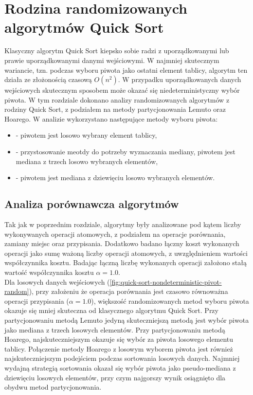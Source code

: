 \section{Rodzina randomizowanych algorytmów Quick Sort}
Klasyczny algorytm Quick Sort kiepsko sobie radzi z uporządkowanymi lub prawie uporządkowanymi danymi wejściowymi. W najmniej skutecznym wariancie, tzn. podczas wyboru piwota jako ostatni element tablicy, algorytm ten działa ze złożonością czasową $O(n^2)$. W przypadku uporządkowanych danych wejściowych skutecznym sposobem może okazać się niedeterministyczny wybór piwota. W tym rozdziale dokonano analizy randomizowanych algorytmów z rodziny Quick Sort, z podziałem na metody partycjonowania Lemuto oraz Hoarego. W analizie wykorzystano następujące metody wyboru piwota:

\begin{itemize}
	\setlength\itemsep{0em}
	\item {} - piwotem jest losowo wybrany element tablicy,
	\item {} - przystosowanie meotdy  do potrzeby wyznaczania mediany, piwotem jest mediana z trzech losowo wybranych elementów,
	\item {} - piwotem jest mediana z dziewięciu losowo wybranych elementów.\\
\end{itemize}

\subsection{Analiza porównawcza algorytmów}
Tak jak w poprzednim rozdziale, algorytmy były analizowane pod kątem liczby wykonywanych operacji atomowych, z podziałem na operacje porównania, zamiany miejsc oraz przypisania. Dodatkowo badano łączny koszt wykonanych operacji jako sumę ważoną liczby operacji atomowych, z uwzględnieniem wartości współczynnika kosztu. Badając łączną liczbę wykonanych operacji założono stałą wartość współczynnika kosztu $\alpha = 1.0$.\\

Dla losowych danych wejściowych (\ref{fig:quick-sort-nondeterministic-pivot-random}), przy założeniu że operacja porównania jest czasowo równoważna operacji przypisania ($\alpha=1.0$), większość randomizowanych metod wyboru piwota okazuje się mniej skuteczna od klasycznego algorytmu Quick Sort. Przy partycjonowaniu metodą Lemuto jedyną skuteczniejszą metodą jest wybór piwota jako mediana z trzech losowych elementów. Przy partycjonowaniu metodą Hoarego, najskuteczniejszym okazuje się wybór za piwota losowego elementu tablicy. Połączenie metody Hoarego z losowym wyborem piwota jest również najskuteczniejszym podejściem podczas sortowania losowych danych. Najmniej wydajną strategią sortowania okazał się wybór piwota jako pseudo-mediana z dziewięciu losowych elementów, przy czym najgorszy wynik osiągnięto dla obydwu metod partycjonowania.\\

